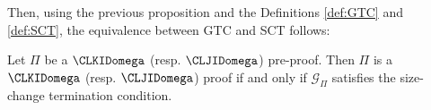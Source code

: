 Then, using the previous proposition and the Definitions \ref{def:GTC} and \ref{def:SCT}, the equivalence between GTC and SCT follows:

\begin{proposition}\label{prop:GTC-SCT}
Let $\Pi$ be a $\CLKIDomega$ (resp. $\CLJIDomega$) pre-proof. Then $\Pi$ is a $\CLKIDomega$ (resp. $\CLJIDomega$) proof if and only if $\mathcal{G}_{\Pi}$ satisfies the size-change termination condition.
\end{proposition}